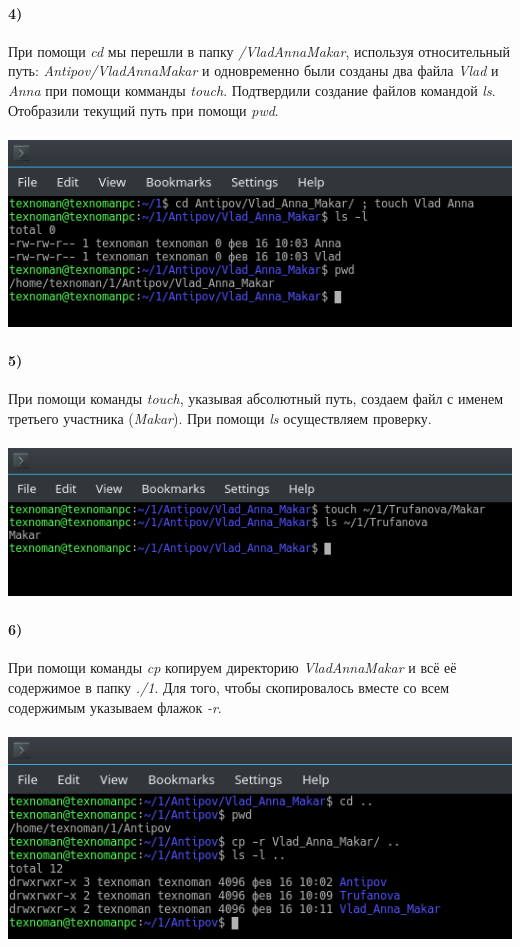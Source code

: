 	\paragraph{4)}
	При помощи \textit{cd} мы перешли в папку \textit{/VladAnnaMakar}, используя относительный путь: \textit{Antipov/VladAnnaMakar} и одновременно были созданы два файла \textit{Vlad} и \textit{Anna} при помощи комманды \textit{touch}. Подтвердили создание файлов командой \textit{ls}. Отобразили текущий путь при помощи \textit{pwd}.\\
	\\
	\includegraphics[width=\textwidth]{4.png}

	\paragraph{5)}
	При помощи команды \textit{touch}, указывая абсолютный путь, создаем файл с именем третьего участника (\textit{Makar}). При помощи \textit{ls} осуществляем проверку.\\
	\\
	\includegraphics[width=\textwidth]{5.png}

	\paragraph{6)}
	При помощи команды \textit{cp} копируем директорию \textit{VladAnnaMakar} и всё её содержимое в папку \textit{./1}.
	Для того, чтобы скопировалось вместе со всем содержимым указываем флажок \textit{-r}.\\
	\\
	\includegraphics[width=\textwidth]{6.png}

